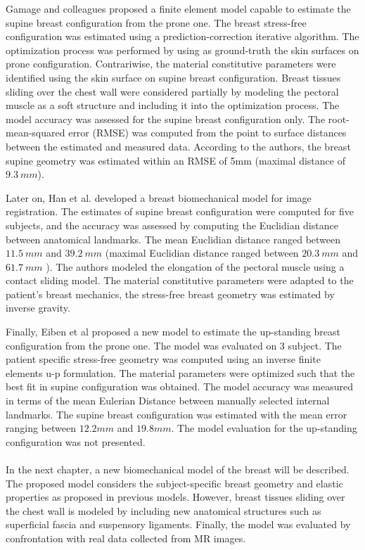  Gamage and colleagues \citep{gamage_modelling_2012} proposed a finite element model capable to estimate the supine breast configuration from the prone one. The breast stress-free configuration was estimated using a prediction-correction iterative algorithm. The optimization process was performed by using as ground-truth the skin surfaces on prone configuration. Contrariwise, the material constitutive parameters were identified using the skin surface on supine breast configuration. Breast tissues sliding over the chest wall were considered partially by modeling the pectoral muscle as a soft structure and including it into the optimization process. The model accuracy was assessed for the supine breast configuration only. The root-mean-squared error (RMSE) was computed from the point to surface distances between the estimated and measured data. According to the authors, the breast supine geometry was estimated within an RMSE of 5mm (maximal distance of $9.3\ mm$). 

Later on, Han et al. \citep{han_nonlinear_2014} developed a breast biomechanical model for image registration. The estimates of supine breast configuration were computed for five subjects, and the accuracy was assessed by computing the Euclidian distance between anatomical landmarks.  The mean Euclidian distance ranged between $11.5\ mm$ and $39.2\ mm$ (maximal Euclidian distance ranged between $20.3\ mm$ and $61.7\ mm$ ). The authors modeled the elongation of the pectoral muscle using a contact sliding model. The material constitutive parameters were adapted to the patient’s breast mechanics, the stress-free breast geometry was estimated by inverse gravity. 

Finally, Eiben et al \citep{eiben_surface_2016} proposed a new model to estimate the up-standing breast configuration from the prone one. The model was evaluated on 3 subject. The patient specific stress-free geometry was computed using an inverse finite elements u-p formulation. The material parameters were optimized such that the best fit in supine configuration was obtained. The model accuracy was measured in terms of the mean Eulerian Distance between manually selected internal landmarks. The supine breast configuration was estimated with the mean error ranging between $12.2mm$ and $19.8 mm$. The model evaluation for the up-standing configuration was not presented.\\
\\

In the next chapter, a new biomechanical model of the breast will be described. The proposed model considers the subject-specific breast geometry and elastic properties as proposed in previous models. However,  breast tissues sliding over the chest wall is modeled by including new anatomical structures such as superficial fascia and suspensory ligaments. Finally, the model was evaluated by confrontation with real data collected from MR images.        
 
 

